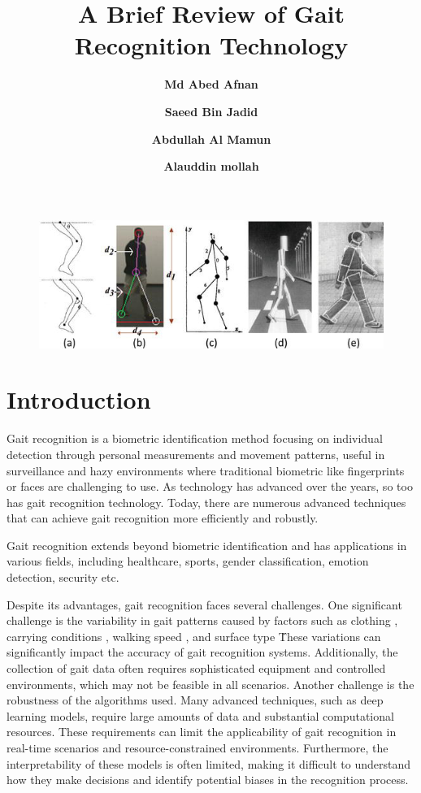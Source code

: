 \documentclass[a4paper]{article}
\title{\textsf{\textbf{A Brief Review of Gait Recognition Technology}}}
\author[1]{\textbf{Md Abed Afnan}}
\author[2]{\textbf{Saeed Bin Jadid}}
\author[3]{\textbf{Abdullah Al Mamun}}
\author[4]{\textbf{Alauddin mollah}}
\affil[1,2,3,4]{Student, Dept. of CSE, International islamic university chittagong}
\affil[ ]{\{c201004, c211042, c211051, c211055\}@ugrad.iiuc.ac.bd}
\begin{document}
\maketitle

\begin{figure}[!ht]
\centering
\includegraphics[width=0.7\linewidth]{F2.png}
\end{figure}
\section{\textsf{Introduction}}
Gait recognition is a biometric identification method focusing on individual detection through personal measurements and movement patterns, useful in surveillance and hazy environments where traditional biometric like fingerprints or faces are challenging to use. As technology has advanced over the years, so too has gait recognition technology. Today, there are numerous advanced techniques that can achieve gait recognition more efficiently and robustly.

Gait recognition extends beyond biometric identification and has applications in various fields, including healthcare, sports\cite{2}, gender classification\cite{3}, emotion detection\cite{4}, security etc.

Despite its advantages, gait recognition faces several challenges. One significant challenge is the variability in gait patterns caused by factors such as clothing \cite{9}, carrying conditions \cite{16}, walking speed \cite{7}, and surface type \. These variations can significantly impact the accuracy of gait recognition systems. Additionally, the collection of gait data often requires sophisticated equipment and controlled environments, which may not be feasible in all scenarios. Another challenge is the robustness of the algorithms used. Many advanced techniques, such as deep learning models, require large amounts of data and substantial computational resources. These requirements can limit the applicability of gait recognition in real-time scenarios and resource-constrained environments. Furthermore, the interpretability of these models is often limited, making it difficult to understand how they make decisions and identify potential biases in the recognition process.
\end{document}
